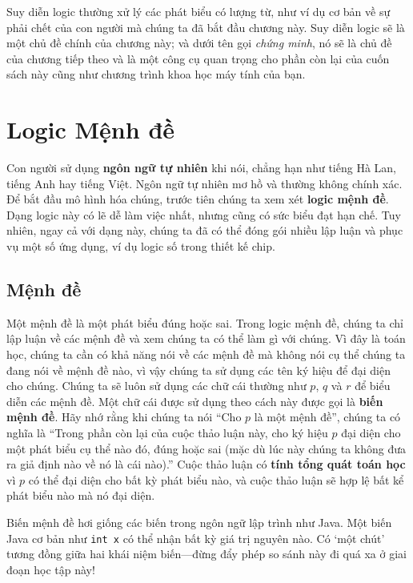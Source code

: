 Suy diễn logic thường xử lý các phát biểu có lượng từ, như ví dụ cơ bản về sự phải chết của con người mà chúng ta đã bắt đầu chương này. Suy diễn logic sẽ là một chủ đề chính của chương này; và dưới tên gọi \emph{chứng minh}, nó sẽ là chủ đề của chương tiếp theo và là một công cụ quan trọng cho phần còn lại của cuốn sách này cũng như chương trình khoa học máy tính của bạn.

\section{Logic Mệnh đề}

Con người sử dụng \textbf{ngôn ngữ tự nhiên} khi nói, chẳng hạn như tiếng Hà Lan, tiếng Anh hay tiếng Việt. Ngôn ngữ tự nhiên mơ hồ và thường không chính xác. Để bắt đầu mô hình hóa chúng, trước tiên chúng ta xem xét \textbf{logic mệnh đề}. Dạng logic này có lẽ dễ làm việc nhất, nhưng cũng có sức biểu đạt hạn chế. Tuy nhiên, ngay cả với dạng này, chúng ta đã có thể đóng gói nhiều lập luận và phục vụ một số ứng dụng, ví dụ logic số trong thiết kế chip.

\subsection{Mệnh đề}

Một mệnh đề là một phát biểu đúng hoặc sai. Trong logic mệnh đề, chúng ta chỉ lập luận về các mệnh đề và xem chúng ta có thể làm gì với chúng. Vì đây là toán học, chúng ta cần có khả năng nói về các mệnh đề mà không nói cụ thể chúng ta đang nói về mệnh đề nào, vì vậy chúng ta sử dụng các tên ký hiệu để đại diện cho chúng. Chúng ta sẽ luôn sử dụng các chữ cái thường như $p$, $q$ và $r$ để biểu diễn các mệnh đề. Một chữ cái được sử dụng theo cách này được gọi là \textbf{biến mệnh đề}. Hãy nhớ rằng khi chúng ta nói ``Cho $p$ là một mệnh đề'', chúng ta có nghĩa là ``Trong phần còn lại của cuộc thảo luận này, cho ký hiệu $p$ đại diện cho một phát biểu cụ thể nào đó, đúng hoặc sai (mặc dù lúc này chúng ta không đưa ra giả định nào về nó là cái nào).'' Cuộc thảo luận có \textbf{tính tổng quát toán học} vì $p$ có thể đại diện cho bất kỳ phát biểu nào, và cuộc thảo luận sẽ hợp lệ bất kể phát biểu nào mà nó đại diện.

\begin{notebox}
Biến mệnh đề hơi giống các biến trong ngôn ngữ lập trình như Java. Một biến Java cơ bản như \texttt{int x} có thể nhận bất kỳ giá trị nguyên nào. Có `một chút' tương đồng giữa hai khái niệm biến---đừng đẩy phép so sánh này đi quá xa ở giai đoạn học tập này!
\end{notebox}

